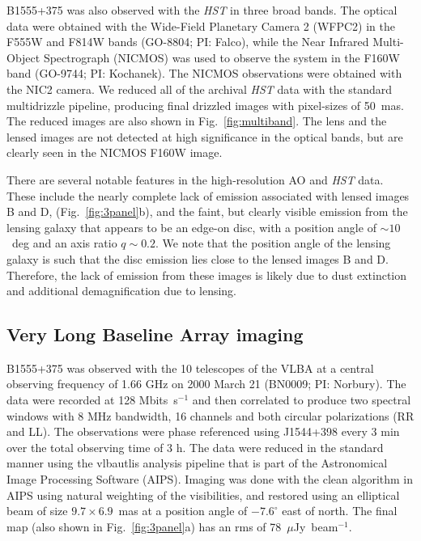 \documentclass[a4paper,fleqn,usenatbib,useAMS]{mnras}
\begin{document}
B1555+375 was also observed with the {\it HST} in three broad bands.  The optical data were obtained with the Wide-Field Planetary Camera 2 (WFPC2) in the F555W and F814W bands (GO-8804; PI: Falco), while the Near Infrared Multi-Object Spectrograph (NICMOS) was used to observe the system in the F160W band (GO-9744; PI: Kochanek).  The NICMOS observations were obtained with the NIC2 camera.  We reduced all of the archival \textit{HST} data with the standard {\sc multidrizzle} pipeline, producing final drizzled images with pixel-sizes of 50~mas. The reduced images are also shown in Fig.~\ref{fig:multiband}. The lens and the lensed images are not detected at high significance in the optical bands, but are clearly seen in the NICMOS F160W image.

There are several notable features in the high-resolution AO and {\it HST} data. These include the nearly complete lack of emission associated with lensed images B and D, 
(Fig.~\ref{fig:3panel}b), and the faint, but clearly visible emission from the lensing galaxy that appears to be an edge-on disc, with a position angle of $\sim 10$~deg and an axis ratio $q \sim 0.2$.  We note that the position angle of the lensing galaxy is such that the disc emission lies close to the lensed images B and D. Therefore, the lack of emission from these images is likely due to dust extinction and additional demagnification due to lensing. 

\subsection{Very Long Baseline Array imaging}

B1555+375 was observed with the 10 telescopes of the VLBA at a central observing frequency of 1.66 GHz on 2000 March 21 (BN0009; PI: Norbury). The data were recorded at 128 Mbits~s$^{-1}$ and then correlated to produce two spectral windows with 8 MHz bandwidth, 16 channels and both circular polarizations (RR and LL). The observations were phase referenced using J1544+398 every 3 min over the total observing time of 3 h. The data were reduced in the standard manner using the {\sc vlbautlis} analysis pipeline that is part of the Astronomical Image Processing Software (AIPS). Imaging was done with the {\sc clean} algorithm in AIPS using natural weighting of the visibilities, and restored using an elliptical beam of size $9.7 \times 6.9$~mas at a position angle of $-7.6^\circ$ east of north. The final map (also shown in Fig.~\ref{fig:3panel}a) has an rms of 78~$\mu$Jy~beam$^{-1}$.
\end{document}

